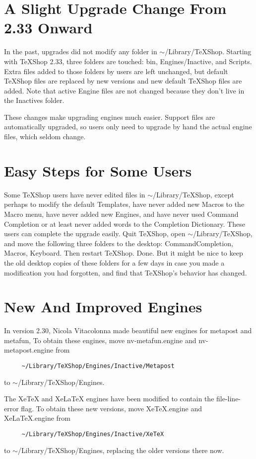 \documentclass[11pt, oneside]{amsart}
\begin{document}
\section{A Slight Upgrade Change From 2.33 Onward}

In the past, upgrades did not modify any folder in $\sim$/Library/TeXShop. Starting with TeXShop 2.33, three folders are touched:  bin, Engines/Inactive, and Scripts. Extra files added to those folders by users are left unchanged, but default TeXShop files are replaced by new versions and new default TeXShop files are added. Note that active Engine files are not changed because they don't live in the Inactives folder.

These changes make upgrading engines much easier. Support files are automatically upgraded, so users only need to upgrade by hand  the actual engine files, which seldom change.

\section{Easy Steps for Some Users}

Some TeXShop users have never edited files in $\sim$/Library/TeXShop, except perhaps to modify the default Templates, have never added new Macros to the Macro menu, have never added  new Engines, and  have never used Command Completion or at least never added words to the Completion Dictionary.
These users can complete the upgrade easily. Quit TeXShop, open $\sim$/Library/TeXShop, and move the following three folders to the desktop:
CommandCompletion, Macros, Keyboard. Then restart TeXShop. Done. But it might be nice to keep the old desktop copies of these folders for a few days in case you made a modification you had forgotten, and find that TeXShop's behavior has changed.

\section{New And Improved Engines}

In version 2.30, Nicola Vitacolonna made beautiful new engines for metapost and metafun,  To obtain these engines, move nv-metafun.engine and nv-metapost.engine from 
\begin{verbatim}
     ~/Library/TeXShop/Engines/Inactive/Metapost
\end{verbatim}
to $\sim$/Library/TeXShop/Engines.

The XeTeX and XeLaTeX engines have been modified to contain the file-line-error flag. To obtain these new versions, move XeTeX.engine and XeLaTeX.engine from
\begin{verbatim}
     ~/Library/TeXShop/Engines/Inactive/XeTeX
\end{verbatim}
to $\sim$/Library/TeXShop/Engines, replacing the older versions there now.
\end{document}
